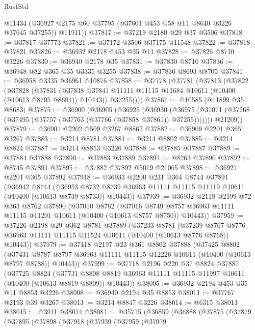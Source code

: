 \begin{lexlean}{RustStd}
\begin{coremodule}
{\begin{coremodule}
{{{{{{{{{{{{{{{{{{{{{{{{{        @11434
        (@36927 @2175 @60 @37795 (@37601 @453 @58 @11 @8640 @3226 @37645 @37255))
        @11911))
@37817 := @37219 @2180 @29 @37 @3506
@37818 := @37817 @37773
@37821 := @37172 @3506 @37175 @11548
@37822 := @37818 @37821
@37826 := @36932 @2178 @453 @35 @11
@37828 := @37826 @8710 @3226
@37830 := @36940 @2178 @35
@37831 := @37830 @8710
@37836 := @36948 @82 @365 @35 @3335 @3255
@37838 := @37836 @8693 @8705
@37841 := @36958 @3335 @36961 @10876
@37858 := @37778
    (@37781
      (@37813
        (@37822
          (@37828
            (@37831
              (@37838 @37841 @11111 @11115 @11684 @10611 (@10400 (@10613 @8705 @8694)) @10443))
            @37255))))
@37861 := @10585 (@11899 @35 @8683)
@37875 := @36900
    (@36905
      (@36925
        (@36930
          (@36975 (@37071 (@37268 (@37495 (@37757 (@37763 (@37766 (@37858 @37861)) @37255)))))))
        @21209))
@37879 := @36901 @2202 @509 @3267 @8862
@37882 := @36909 @2201 @365 @3267
@37883 := @3214 @8781
@37884 := @3214 @8802
@37885 := @3214 @8824
@37887 := @3214 @8853 @3226
@37888 := @37885 @37887
@37889 := @37884 @37888
@37890 := @37883 @37889
@37891 := @8763 @37890
@37892 := @8745 @37891
@37895 := @37882 @37892 @5019 @21065
@37898 := @36927 @2201 @365 @37892
@37918 := @36933
    @2200
    @231
    @364
    @8744
    @37891
    (@36942
      @8744
      (@36953 @8732 @8739 @36963 @11111 @11115 @11119 @10611 (@10400 (@10613 @8739 @8733)) @10443))
@37939 := @36932
    @2118
    @2199
    @72
    @363
    @8762
    @37890
    (@37010
      @8762
      (@37016 @8749 @8757 @36963 @11111 @11115 @11201 @10611 (@10400 (@10613 @8757 @8750)) @10443))
@37959 := @37226
    @2198
    @29
    @362
    @8781
    @37889
    (@37233
      @8781
      (@37239 @8767 @8776 @36963 @11111 @11115 @11524 @10611 (@10400 (@10613 @8776 @8768)) @10443))
@37979 := @37418
    @2197
    @23
    @361
    @8802
    @37888
    (@37425
      @8802
      (@37431 @8787 @8797 @36963 @11111 @11115 @12226 @10611 (@10400 (@10613 @8797 @8788)) @10443))
@37999 := @37718
    @2196
    @220
    @37
    @8824
    @37887
    (@37725
      @8824
      (@37731 @8808 @8819 @36963 @11111 @11115 @11997 @10611 (@10400 (@10613 @8819 @8809)) @10443))
@38005 := @36932 @2194 @453 @35 @11 @8853 @3226
@38008 := @36940 @2194 @35 @8853
@38011 := @37767 @2193 @39 @3267
@38013 := @3214 @8847 @3226
@38014 := @6315 @38013
@38015 := @3911 @38014
@38081 := @35715
    (@36859
      (@36888
        (@37875
          (@37879
            (@37895
              (@37898
                (@37918
                  (@37939
                    (@37959
                      (@37979
}}}}}}}}}}}}}}}}}}}}}}}}}
\end{coremodule}}
\end{coremodule}
\end{lexlean}
